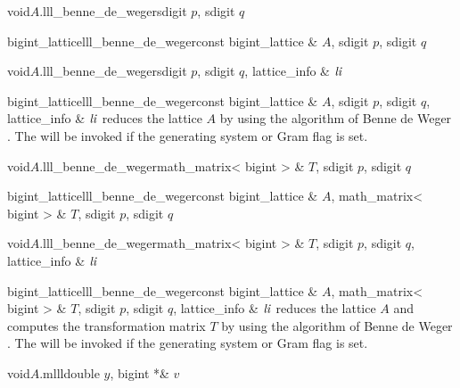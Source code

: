
\begin{fcode}{void}{$A$.lll_benne_de_weger}{sdigit $p$, sdigit $q$}
\end{fcode}

\begin{fcode}{bigint_lattice}{lll_benne_de_weger}{const bigint_lattice & $A$, sdigit $p$, sdigit $q$}
\end{fcode}

\begin{fcode}{void}{$A$.lll_benne_de_weger}{sdigit $p$, sdigit $q$, lattice_info & $\mathit{li}$}
\end{fcode}

\begin{fcode}{bigint_lattice}{lll_benne_de_weger}{const bigint_lattice & $A$, sdigit $p$,
    sdigit $q$, lattice_info & $\mathit{li}$}%
  reduces the lattice $A$ by using the algorithm of Benne de Weger \cite{dWeger:1989}.  The \LEH
  will be invoked if the generating system or Gram flag is set.
\end{fcode}

\begin{fcode}{void}{$A$.lll_benne_de_weger}{math_matrix< bigint > & $T$, sdigit $p$, sdigit $q$}
\end{fcode}

\begin{fcode}{bigint_lattice}{lll_benne_de_weger}{const bigint_lattice & $A$,
    math_matrix< bigint > & $T$, sdigit $p$, sdigit $q$}%
\end{fcode}

\begin{fcode}{void}{$A$.lll_benne_de_weger}{math_matrix< bigint > & $T$, sdigit $p$,
    sdigit $q$, lattice_info & $\mathit{li}$}%
\end{fcode}

\begin{fcode}{bigint_lattice}{lll_benne_de_weger}{const bigint_lattice & $A$,
    math_matrix< bigint > & $T$, sdigit $p$, sdigit $q$, lattice_info & $\mathit{li}$}%
  reduces the lattice $A$ and computes the transformation matrix $T$ by using the algorithm of
  Benne de Weger \cite{dWeger:1989}.  The \LEH will be invoked if the generating system or Gram
  flag is set.
\end{fcode}



\begin{fcode}{void}{$A$.mlll}{double $y$, bigint *& $v$}
\end{fcode}

